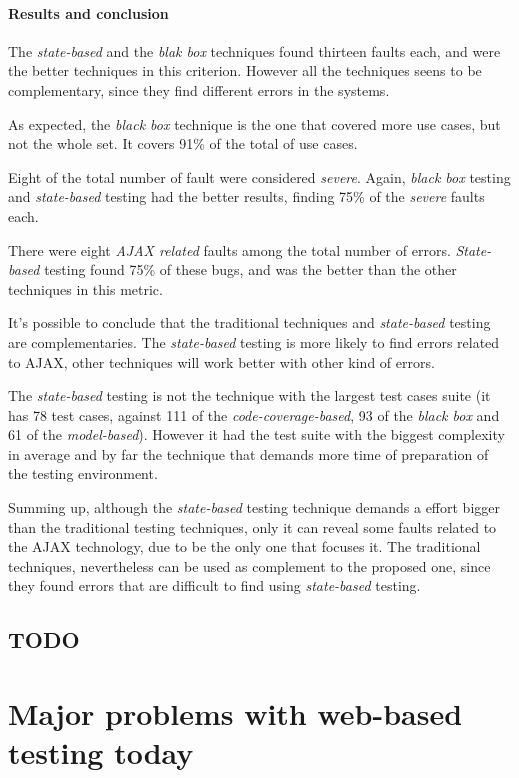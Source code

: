 \documentclass[a4paper]{article}
\begin{document}
\begin {itemize}
\paragraph{Results and conclusion}

The \emph{state-based} and the \emph{blak box} techniques found thirteen faults each, and were the better techniques in this criterion.
However all the techniques seens to be complementary, since they find different errors in the systems.

As expected, the \emph{black box} technique is the one that covered more use cases, but not the whole set.
It covers 91\% of the total of use cases.

Eight of the total number of fault were considered \emph{severe}. Again, \emph{black box} testing and \emph{state-based} testing had the better results, finding 75\% of the \emph{severe} faults each.

There were eight \emph{AJAX related} faults among the total number of errors. 
\emph{State-based} testing found 75\% of these bugs, and was the better than the other techniques in this metric.

It's possible to conclude that the traditional techniques and \emph{state-based} testing are complementaries.
The \emph{state-based} testing is more likely to find errors related to AJAX, other techniques will work better with other kind of errors.

The \emph{state-based} testing is not the technique with the largest test cases suite (it has 78 test cases, against 111 of the \emph{code-coverage-based}, 93 of the \emph{black box} and 61 of the \emph{model-based}).
However it had the test suite with the biggest complexity in average and by far the technique that demands more time of preparation of the testing environment.

Summing up, although the \emph{state-based} testing technique demands a effort bigger than the traditional testing techniques, only it can reveal some faults related to the AJAX technology, due to be the only one that focuses it.
The traditional techniques, nevertheless can be used as complement to the proposed one, since they found errors that are difficult to find using \emph{state-based} testing.

\subsection{TODO}

\section{Major problems with web-based testing today}


\end{itemize}
\end{document}
